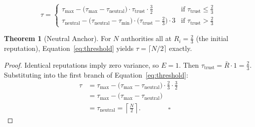 \documentclass[12pt,a4paper]{article}
\theoremstyle{definition}
\newtheorem{theorem}{Theorem}[section]
\theoremstyle{remark}
\begin{document}
\begin{equation}
  \boxed{\tau =
    \begin{cases}
      \tau_{\text{max}} -
        \bigl(\tau_{\text{max}} - \tau_{\text{neutral}}\bigr)
        \cdot \tau_{\text{trust}} \cdot \tfrac{3}{2}
        & \text{if } \tau_{\text{trust}} \leq \tfrac{2}{3} \\[10pt]
      \tau_{\text{neutral}} -
        \bigl(\tau_{\text{neutral}} - \tau_{\text{min}}\bigr)
        \cdot \bigl(\tau_{\text{trust}} - \tfrac{2}{3}\bigr) \cdot 3
        & \text{if } \tau_{\text{trust}} > \tfrac{2}{3}
    \end{cases}}
  \label{eq:threshold}
\end{equation}

\begin{theorem}[Neutral Anchor]
\label{thm:anchor}
  For $N$ authorities all at $R_i = \tfrac{2}{3}$ (the initial
  reputation), Equation~\eqref{eq:threshold} yields
  $\tau = \lceil N/2 \rceil$ exactly.
\end{theorem}
\begin{proof}
  Identical reputations imply zero variance, so $E = 1$.
  Then $\tau_{\text{trust}} = \bar{R} \cdot 1 = \tfrac{2}{3}$.
  Substituting into the first branch of Equation~\eqref{eq:threshold}:
  \begin{align*}
    \tau &= \tau_{\text{max}} -
      \bigl(\tau_{\text{max}} - \tau_{\text{neutral}}\bigr)
      \cdot \tfrac{2}{3} \cdot \tfrac{3}{2} \\
         &= \tau_{\text{max}} -
      \bigl(\tau_{\text{max}} - \tau_{\text{neutral}}\bigr) \\
         &= \tau_{\text{neutral}}
          = \left\lceil \tfrac{N}{2} \right\rceil. \qquad\qquad\square
  \end{align*}
\end{proof}
\end{document}
